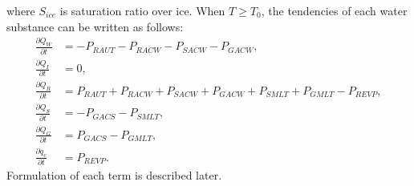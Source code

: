 where $S_{ice}$ is saturation ratio over ice. When $T \geq T_{0}$, the tendencies of each water substance can be written as follows:
\begin{align}
  \frac{\partial Q_{W}}{\partial t} &= -P_{RAUT}-P_{RACW}-P_{SACW}-P_{GACW}, \\
  \frac{\partial Q_{I}}{\partial t} &= 0, \\
  \frac{\partial Q_{R}}{\partial t} &= P_{RAUT}+P_{RACW}+P_{SACW}+P_{GACW}+P_{SMLT}+P_{GMLT}-P_{REVP}, \\
  \frac{\partial Q_{S}}{\partial t} &= -P_{GACS}-P_{SMLT}, \\
  \frac{\partial Q_{G}}{\partial t} &= P_{GACS}-P_{GMLT}, \\
  \frac{\partial q_{v}}{\partial t} &= P_{REVP}.
\end{align}
Formulation of each term is described later.
